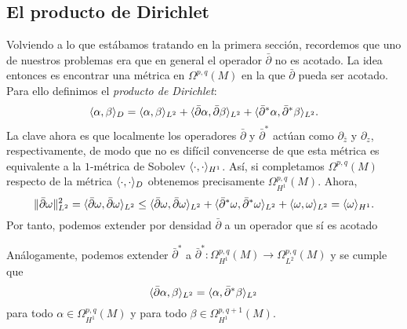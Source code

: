 \documentclass[12pt,a4paper]{article}
\theoremstyle{definition} \newtheorem{defn}[thm]{Definición}
\theoremstyle{definition} \newtheorem{ejemplo}[thm]{Ejemplo}
\theoremstyle{definition} \newtheorem{ejercicio}[thm]{Ejercicio}
\theoremstyle{remark} \newtheorem*{obs}{Observación}
\DeclarePairedDelimiter\norm{\lVert}{\rVert}
\DeclarePairedDelimiter\esc{\langle}{\rangle}
\newcommand{\dol}{\bar{\partial}}
\begin{document}
   \subsection{El producto de Dirichlet}
   Volviendo a lo que estábamos tratando en la primera sección, recordemos que uno de nuestros problemas era que en general el operador $\dol$ no es acotado. La idea entonces es encontrar una métrica en $\Omega^{p,q}(M)$ en la que $\dol$ pueda ser acotado. Para ello definimos el \emph{producto de Dirichlet}:
   \begin{equation*}
     \esc{\alpha,\beta}_{D} = \esc{\alpha,\beta}_{L^2} + \esc{\dol \alpha, \dol \beta}_{L^2} + \esc{\dol^*\alpha, \dol^*\beta}_{L^2}.
   \end{equation*}
   La clave ahora es que localmente los operadores $\dol$ y $\dol^*$ actúan como $\partial_{\bar{z}}$ y $\partial_{z}$, respectivamente, de modo que no es difícil convencerse de que esta métrica es equivalente a la $1$-métrica de Sobolev $\esc{\cdot,\cdot}_{H^1}$. Así, si completamos $\Omega^{p,q}(M)$ respecto de la métrica $\esc{\cdot,\cdot}_D$ obtenemos precisamente $\Omega^{p,q}_{H^1}(M)$. Ahora,
   \begin{equation*}
     \norm{\dol \omega}_{L^2}^2 = \esc{\dol \omega,\dol \omega}_{L^2} \leq \esc{\dol \omega, \dol \omega}_{L^2} + \esc{\dol^* \omega, \dol^*\omega}_{L^2} + \esc{\omega, \omega}_{L^2} = \esc{\omega}_{H^1}.
   \end{equation*}
   Por tanto, podemos extender por densidad $\dol$ a un operador que sí es acotado
   \begin{center}
    \end{center}
    Análogamente, podemos extender $\dol^*$ a $\dol^*:\Omega^{p,q}_{H^1}(M) \rightarrow \Omega^{p,q}_{L^2}(M)$ y se cumple que
    \begin{equation*}
      \esc{\dol \alpha, \beta}_{L^2}= \esc{\alpha, \dol^*\beta}_{L^2}
    \end{equation*}
    para todo $\alpha \in \Omega^{p,q}_{H^1}(M)$ y para todo $\beta \in \Omega^{p,q+1}_{H^1}(M)$.
\end{document}
